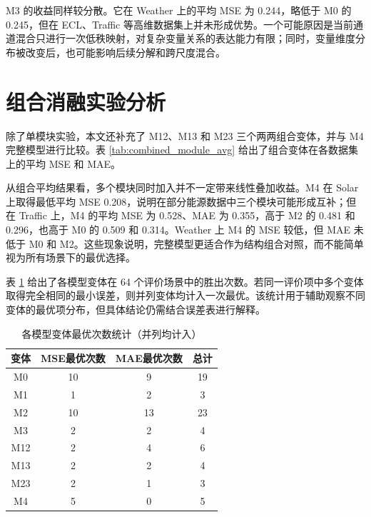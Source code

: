 M3 的收益同样较分散。它在 Weather 上的平均 MSE 为 0.244，略低于 M0 的 0.245，但在 ECL、Traffic 等高维数据集上并未形成优势。一个可能原因是当前通道混合只进行一次低秩映射，对复杂变量关系的表达能力有限；同时，变量维度分布被改变后，也可能影响后续分解和跨尺度混合。

\section{组合消融实验分析}

除了单模块实验，本文还补充了 M12、M13 和 M23 三个两两组合变体，并与 M4 完整模型进行比较。表 \ref{tab:combined_module_avg} 给出了组合变体在各数据集上的平均 MSE 和 MAE。



从组合平均结果看，多个模块同时加入并不一定带来线性叠加收益。M4 在 Solar 上取得最低平均 MSE 0.208，说明在部分能源数据中三个模块可能形成互补；但在 Traffic 上，M4 的平均 MSE 为 0.528、MAE 为 0.355，高于 M2 的 0.481 和 0.296，也高于 M0 的 0.509 和 0.314。Weather 上 M4 的 MSE 较低，但 MAE 未低于 M0 和 M2。这些现象说明，完整模型更适合作为结构组合对照，而不能简单视为所有场景下的最优选择。

表 \ref{tab:wins} 给出了各模型变体在 64 个评价场景中的胜出次数。若同一评价项中多个变体取得完全相同的最小误差，则并列变体均计入一次最优。该统计用于辅助观察不同变体的最优项分布，但具体结论仍需结合误差表进行解释。

\begin{table}[htbp]
    \centering
    \caption{各模型变体最优次数统计（并列均计入）}
    \label{tab:wins}
    \begin{tabular*}{\textwidth}{@{\extracolsep{\fill}}cccc@{}}
        \toprule
        变体 & MSE最优次数 & MAE最优次数 & 总计 \\
        \midrule
        M0 & 10 & 9 & 19 \\
        M1 & 1 & 2 & 3 \\
        M2 & 10 & 13 & 23 \\
        M3 & 2 & 2 & 4 \\
        M12 & 2 & 4 & 6 \\
        M13 & 2 & 2 & 4 \\
        M23 & 2 & 1 & 3 \\
        M4 & 5 & 0 & 5 \\
        \bottomrule
    \end{tabular*}
\end{table}

